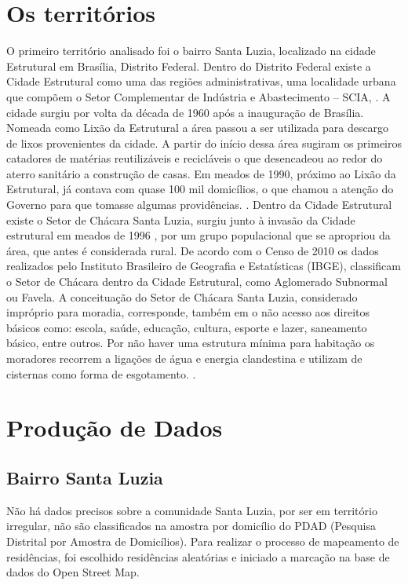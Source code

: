 
\section{Os territórios}

O primeiro território analisado foi o bairro Santa Luzia, localizado na cidade Estrutural em Brasília, Distrito Federal.  Dentro do Distrito Federal existe a Cidade Estrutural como uma das regiões administrativas, uma localidade urbana que compõem o Setor Complementar de Indústria e Abastecimento – SCIA, \cite{souza2016nao}.
A cidade surgiu por volta da década de 1960 após a inauguração de Brasília. Nomeada como Lixão da Estrutural a área passou a ser utilizada para descargo de lixos provenientes da cidade. A partir do início dessa área sugiram os primeiros catadores de matérias reutilizáveis e recicláveis o que desencadeou ao redor do aterro sanitário a construção de casas. Em meados de 1990, próximo ao Lixão da Estrutural, já contava com quase 100 mil domicílios, o que chamou a atenção do Governo para que tomasse algumas providências. \cite{souza2016nao}.
Dentro da Cidade Estrutural existe o Setor de Chácara Santa Luzia, surgiu junto à invasão da Cidade estrutural em meados de 1996 , por um grupo populacional que se apropriou da área, que antes é considerada rural. De acordo com o Censo de 2010 os dados realizados pelo Instituto Brasileiro de Geografia e Estatísticas (IBGE), classificam o Setor de Chácara dentro da Cidade Estrutural, como Aglomerado Subnormal ou Favela. \cite{souza2016nao}
A conceituação do Setor de Chácara Santa Luzia, considerado impróprio para moradia, corresponde, também em o não acesso aos direitos básicos como: escola, saúde, educação, cultura, esporte e lazer, saneamento básico, entre outros. Por não haver uma estrutura mínima para habitação os moradores recorrem a ligações de água e energia clandestina e utilizam de cisternas como forma de esgotamento. \cite{souza2016nao}.

\section{Produção de Dados}

\subsection{Bairro Santa Luzia}


Não há dados precisos sobre a comunidade Santa Luzia, por ser em território irregular, não são classificados na amostra por domicílio do PDAD (Pesquisa Distrital por Amostra de Domicílios). Para realizar o processo de mapeamento de residências, foi escolhido residências aleatórias e iniciado a marcação na base de dados do Open Street Map.

